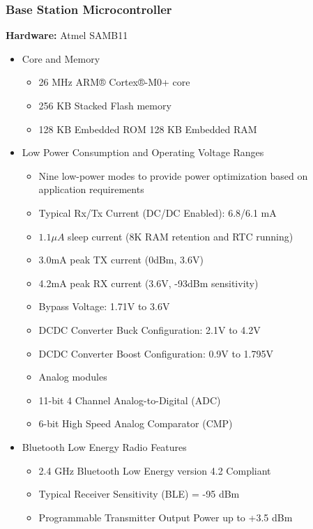 \documentclass[journal,compsoc]{IEEEtran}
\begin{document}
\subsubsection{Base Station Microcontroller}

\textbf {Hardware:} Atmel SAMB11

\begin{itemize}
  \item Core and Memory
    \begin{itemize}
      \item 26 MHz ARM® Cortex®-M0+ core
      \item 256 KB Stacked Flash memory
      \item 128 KB Embedded ROM
        128 KB Embedded RAM
    \end{itemize}
  \item Low Power Consumption and Operating Voltage Ranges
    \begin{itemize}
      \item Nine low-power modes to provide power optimization based on application requirements
      \item Typical Rx/Tx Current (DC/DC Enabled): 6.8/6.1 mA
      \item $1.1\mu A$ sleep current (8K RAM retention and RTC running)
      \item 3.0mA peak TX current (0dBm, 3.6V)
      \item 4.2mA peak RX current (3.6V, -93dBm sensitivity)
      \item Bypass Voltage: 1.71V to 3.6V
      \item DCDC Converter Buck Configuration: 2.1V to 4.2V
      \item DCDC Converter Boost Configuration: 0.9V to 1.795V
      \item Analog modules
      \item 11-bit 4 Channel Analog-to-Digital (ADC)
      \item 6-bit High Speed Analog Comparator (CMP)
    \end{itemize}
  \item Bluetooth Low Energy Radio Features
    \begin{itemize}
      \item 2.4 GHz Bluetooth Low Energy version 4.2 Compliant
      \item Typical Receiver Sensitivity (BLE) = -95 dBm
      \item Programmable Transmitter Output Power up to +3.5 dBm
    \end{itemize}
\end{itemize}
\end{document}
